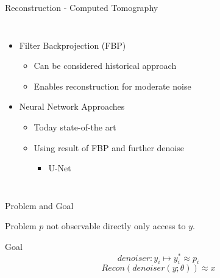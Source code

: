 \begin{frame}{Reconstruction -  Computed Tomography}
    \begin{columns}
        
        \begin{itemize}
            \item Filter Backprojection (FBP)
            \begin{itemize}
                \item Can be considered historical approach
                \item Enables reconstruction for moderate noise
            \end{itemize}
            \item<3> Neural Network Approaches
            \begin{itemize}
                \item Today state-of-the art
                \item Using result of FBP and further denoise
                \begin{itemize}
                    \item U-Net \cite{unet-tomography}
                \end{itemize}
            \end{itemize}
        \end{itemize}


    \end{columns}
\end{frame}



\begin{frame}{Problem and Goal}
    \pause
    \begin{block}{Problem}
        $p$ not observable directly only access to $y$.
    \end{block}
    \pause
    \begin{block}{Goal}
        $$ denoiser:   y_i \mapsto y_i^* \approx p_i $$
        $$ \textit{Recon} \left( denoiser(y; \theta) \right) \approx x $$
    \end{block}

\end{frame}


